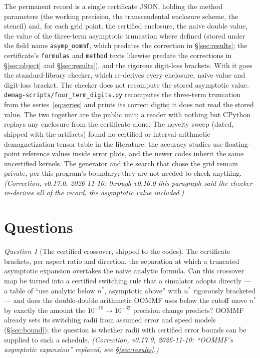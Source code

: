 \documentclass[11pt]{amsart}
\theoremstyle{plain}
\theoremstyle{definition}
\theoremstyle{remark}
\newtheorem{question}[theorem]{Question}
\begin{document}
The permanent record is a single certificate JSON, holding the method parameters
(the working precision, the transcendental enclosure scheme, the stencil) and, for
each grid point, the certified enclosure, the naive double value, the value of
the three-term asymptotic truncation where defined (stored under the field name
\texttt{asymp\_oommf}, which predates the correction in \S\ref{sec:results}; the
certificate's \texttt{formulas} and \texttt{method} texts likewise predate the
corrections in \S\ref{sec:object} and \S\ref{sec:results}), and the rigorous
digit-loss brackets. With it goes the standard-library checker, which re-derives
every enclosure, naive value and digit-loss bracket. The checker does not
recompute the stored asymptotic value. \texttt{demag-scripts/four\_term\_digits.py}
recomputes the three-term truncation from the series~\eqref{eq:series} and prints
its correct digits; it does not read the stored value. The two together are the
public unit; a reader with nothing but CPython replays any enclosure from the
certificate alone. The novelty sweep (dated, shipped with the artifacts) found
no certified or interval-arithmetic demagnetization-tensor table in the
literature: the accuracy studies \cite{CF2015,Bjork2023} use floating-point
reference values inside error plots, and the newer codes inherit the same
uncertified kernels. The generator and the search that chose the grid remain
private, per this program's boundary; they are not needed to check anything.
\emph{(Correction, v0.17.0, 2026-11-10: through v0.16.0 this paragraph said the
checker re-derives all of the record, the asymptotic value included.)}

\section{Questions}

\begin{question}[The certified crossover, shipped to the codes]
The certificate brackets, per aspect ratio and direction, the separation at
which a truncated asymptotic expansion overtakes the naive analytic formula. Can this
crossover map be turned into a certified switching rule that a simulator adopts
directly --- a table of ``use analytic below $n^\ast$, asymptotic above'' with
$n^\ast$ rigorously bracketed --- and does the double-double arithmetic OOMMF uses
below the cutoff move $n^\ast$ by exactly the amount the $10^{-15}\to10^{-32}$
precision change predicts? OOMMF already sets its switching radii from
assumed error and speed models (\S\ref{sec:bound}); the question is whether radii
with certified error bounds can be supplied to such a schedule. \emph{(Correction, v0.17.0, 2026-11-10: ``OOMMF's
asymptotic expansion'' replaced; see \S\ref{sec:results}.)}
\end{question}
\end{document}
